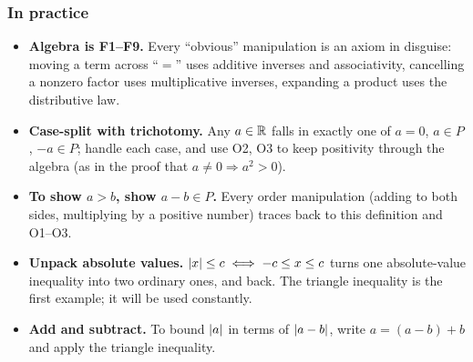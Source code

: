 \subsubsection*{In practice}
\begin{itemize}
    \item \textbf{Algebra is F1--F9.} Every ``obvious'' manipulation is an axiom in disguise: moving a term across ``$=$'' uses additive inverses and associativity, cancelling a nonzero factor uses multiplicative inverses, expanding a product uses the distributive law.
    \item \textbf{Case-split with trichotomy.} Any $a\in\mathbb{R}$ falls in exactly one of $a=0$, $a\in P$, $-a\in P$; handle each case, and use O2, O3 to keep positivity through the algebra (as in the proof that $a\neq0\Rightarrow a^2>0$).
    \item \textbf{To show $a>b$, show $a-b\in P$.} Every order manipulation (adding to both sides, multiplying by a positive number) traces back to this definition and O1--O3.
    \item \textbf{Unpack absolute values.} $\left|x\right|\leq c \iff -c\leq x\leq c$ turns one absolute-value inequality into two ordinary ones, and back. The triangle inequality is the first example; it will be used constantly.
    \item \textbf{Add and subtract.} To bound $\left|a\right|$ in terms of $\left|a-b\right|$, write $a=(a-b)+b$ and apply the triangle inequality.
\end{itemize}
